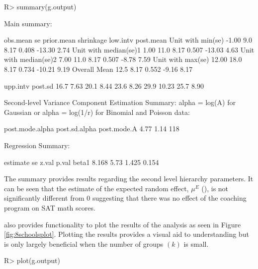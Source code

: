 \documentclass[article]{jss}
\begin{document}
\begin{CodeChunk}
\begin{CodeInput}
R> summary(g.output)
\end{CodeInput}
\begin{CodeOutput}
Main summary:

                      obs.mean   se prior.mean shrinkage low.intv post.mean
Unit with min(se)        -1.00  9.0       8.17     0.408   -13.30      2.74     
Unit with median(se)1     1.00 11.0       8.17     0.507   -13.03      4.63     
Unit with median(se)2     7.00 11.0       8.17     0.507    -8.78      7.59     
Unit with max(se)        12.00 18.0       8.17     0.734   -10.21      9.19     
Overall Mean                   12.5       8.17     0.552    -9.16      8.17     

                      upp.intv post.sd
                          16.7    7.63
                          20.1    8.44
                          23.6    8.26
                          29.9   10.23
                          25.7    8.90

Second-level Variance Component Estimation Summary:
alpha = log(A) for Gaussian or alpha =  log(1/r) for Binomial and Poisson data:

post.mode.alpha post.sd.alpha post.mode.A
           4.77          1.14         118


Regression Summary:

      estimate   se z.val p.val
beta1    8.168 5.73 1.425 0.154
\end{CodeOutput}
\end{CodeChunk}
The summary provides results regarding the second level hierarchy parameters. It can be seen that the estimate of the expected random effect, $\mu^E$ (), is not significantly different from 0 suggesting that there was no effect of the coaching program on SAT math scores. 


 also provides functionality to plot the results of the analysis as seen in Figure \ref{fig:8schoolsplot}. Plotting the results provides a visual aid to understanding but is only largely beneficial when the number of groups $(k)$ is small. 

\begin{CodeChunk}
\begin{CodeInput}
R> plot(g.output)
\end{CodeInput}
\end{CodeChunk}
\end{document}
